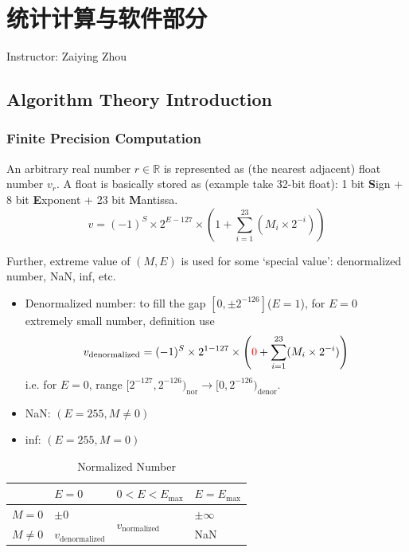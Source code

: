 \section{统计计算与软件部分}\label{SecStatisticalComputingAndSoftware}
\begin{center}
    Instructor: Zaiying Zhou
\end{center}

\subsection{Algorithm Theory Introduction}


\subsubsection{Finite Precision Computation}
    An arbitrary real number $ r\in\mathbb{R} $ is represented as (the nearest adjacent) float number $ v_r $. A float is basically stored as (example take 32-bit float): 1 bit \textbf{S}ign + 8 bit \textbf{E}xponent + 23 bit \textbf{M}antissa.
\begin{equation}\label{EqaNormalizedFloat}
    v=(-1)^S\times 2^{E-127}\times \left(1+\sum_{i=1}^{23}(M_i\times 2^{-i})\right)
\end{equation}
    
    
    Further, extreme value of $ (M,E) $ is used for some `special value': denormalized number, NaN, inf, etc. 
\begin{itemize}[topsep=2pt,itemsep=0pt]
    \item Denormalized number: to fill the gap $ [0,\pm 2^{-126}] $($ E=1 $), for $ E=0 $ extremely small number, definition use 
    \begin{align}
        v_\mathrm{denormalized}=(-1)^S\times 2^{1-127}\times \left({\color{red}0}+\sum_{i=1}^{23}(M_i\times 2^{-i})\right)  
    \end{align}
    i.e. for $ E=0 $, range $ [2^{-127},2^{-126})_\mathrm{nor}\to [0,2^{-126})_\mathrm{denor} $.
    \item NaN: $ (E=255,M\neq 0) $
    \item inf: $ (E=255,M=0) $
\end{itemize}

\begin{table}[H]
    \centering
    \renewcommand\arraystretch{1.15}
    \begin{tabular}{clll}
        \hline
        &$ E=0 $&$ 0<E<E_{\mathrm{max} } $&$ E=E_{\mathrm{max} }  $\\
        \hline
        $ M=0 $&$ \pm 0 $&\multirow{2}{*}{$  v_\mathrm{normalized} $}&$ \pm\infty $\\
        $ M\neq 0 $&$  v_\mathrm{denormalized} $&&NaN\\
        \hline
    \end{tabular}
    \caption{Normalized Number}
    \label{}
\end{table}

